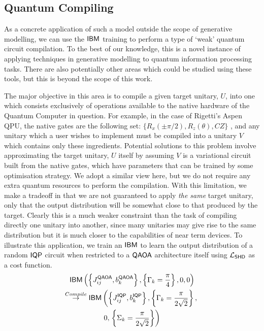 \subsection*{Quantum Compiling}
As a concrete application of such a model outside the scope of generative modelling, we can use the $\textsf{IBM}$ training to perform a type of `weak' quantum circuit compilation. To the best of our knowledge, this is a novel instance of applying techniques in generative modelling to quantum information processing tasks. There are also potentially other areas which could be studied using these tools, but this is beyond the scope of this work.

The major objective in this area is to compile a given target unitary, $U$, into one which consists exclusively of operations available to the native hardware of the Quantum Computer in question. For example, in the case of Rigetti's Aspen QPU, the native gates are the following set: $\{R_x(\pm \pi/2), R_z(\theta), CZ\}$ \cite{smith_practical_2016, khatri_quantum-assisted_2018}, and any unitary which a user wishes to implement must be compiled into a unitary $V$ which contains only these ingredients. Potential solutions to this problem\cite{jones_quantum_2018, khatri_quantum-assisted_2018} involve approximating the target unitary, $U$ itself by assuming $V$ is a variational circuit built from the native gates, which have parameters that can be trained by some optimisation strategy. We adopt a similar view here, but we do not require any extra quantum resources to perform the compilation. With this limitation, we make a tradeoff in that we are not guaranteed to apply \textit{the same} target unitary, only that the output distribution will be somewhat close to that produced by the target. Clearly this is a much weaker constraint than the task of compiling directly one unitary into another, since many unitaries may give rise to the same distribution but it is much closer to the capabilities of near term devices. To illustrate this application, we train an $\textsf{IBM}$ to learn the output distribution of a random $\operatorname{\textsf{IQP}}$ circuit when restricted to a $\operatorname{\textsf{QAOA}}$ architecture itself using $\mathcal{L}_{\operatorname{\textsf{SHD}}}$ as a cost function.
\begin{multline}
    \textsf{IBM}\left(\left\{J^{\operatorname{\textsf{QAOA}}}_{ij}, b^{\operatorname{\textsf{QAOA}}}_k\right\}, \left\{\Gamma_k = \frac{\pi}{4}\right\}, 0,  0\right) \\
    \overset{Compile}{\rightarrow}   \textsf{IBM}\left(\left\{J^{\operatorname{\textsf{IQP}}}_{ij}, b^{\operatorname{\textsf{IQP}}}_k\right\}, \left\{\Gamma_k = \frac{\pi}{2\sqrt{2}}\right\}, \right.\\0, \left.\left\{\Sigma_k = \frac{\pi}{2\sqrt{2}}\right\}\right)
\end{multline}

